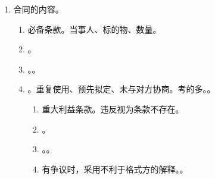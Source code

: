 \begin{enumerate}
        \begin{enumerate}
          \item 时间。
                \begin{enumerate}
                  \item 要式合同。签章、按指印时。
                  \item {}。
                \end{enumerate}
          \item 地点。最后一方按指印地方。
        \end{enumerate}
  \item 合同的内容。
        \begin{enumerate}
          \item 必备条款。当事人、标的物、数量。
          \item {}。
          \item {}。。
          \item {}。重复使用、预先拟定、未与对方协商。考的多。。
                \begin{enumerate}
                  \item 重大利益条款。违反视为条款不存在。
                  \item {}。
                  \item {}。。
                  \item 有争议时，采用不利于格式方的解释。。
                \end{enumerate}
        \end{enumerate}
\end{enumerate}
